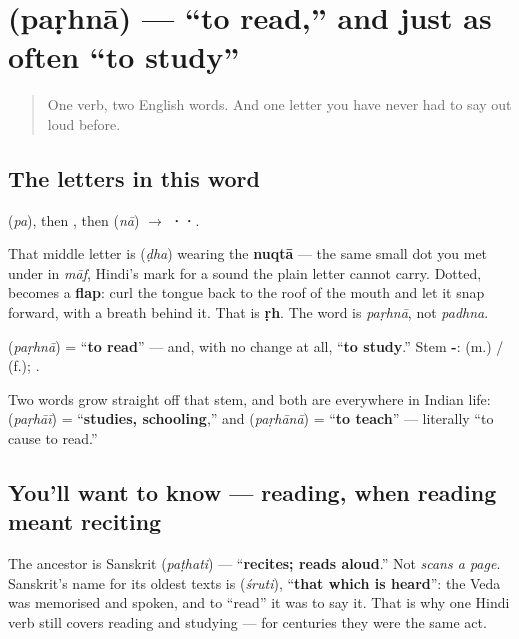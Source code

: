 \section[\texorpdfstring{\hi{पढ़ना} / \hi{पढ़} / \hi{पढ़ता} … (paṛhnā / paṛh …)}{पढ़ना / पढ़ / पढ़ता … (paṛhnā / paṛh …)}]{ (paṛhnā) — \textquotedblleft{}to read,\textquotedblright{} and just as often \textquotedblleft{}to study\textquotedblright{}}

\label{lesson:HI-C34-padhna}



\begin{quote}
One verb, two English words. And one letter you have never had to say out loud before.
\end{quote}

\subsection*{The letters in this word}
\textbf{} (\emph{pa}), then \textbf{}, then \textbf{} (\emph{nā}) $\to$ \textbf{··}.

That middle letter is \textbf{} (\emph{ḍha}) wearing the \textbf{nuqtā} — the same small dot you met under \textbf{} in \emph{māf}, Hindi's mark for a sound the plain letter cannot carry. Dotted, \textbf{} becomes a \textbf{flap}: curl the tongue back to the roof of the mouth and let it snap forward, with a breath behind it. That is \textbf{ṛh}. The word is \emph{paṛhnā}, not \emph{padhna}.

\begin{cousinweb}
\textbf{} (\emph{paṛhnā}) = \textquotedblleft{}\textbf{to read}\textquotedblright{} — and, with no change at all, \textquotedblleft{}\textbf{to study}.\textquotedblright{} Stem \textbf{-}: \textbf{  } (m.) / \textbf{  } (f.); \textbf{  }.

Two words grow straight off that stem, and both are everywhere in Indian life: \textbf{} (\emph{paṛhāī}) = \textquotedblleft{}\textbf{studies, schooling},\textquotedblright{} and \textbf{} (\emph{paṛhānā}) = \textquotedblleft{}\textbf{to teach}\textquotedblright{} — literally \textquotedblleft{}to cause to read.\textquotedblright{}
\end{cousinweb}

\subsection*{You'll want to know — reading, when reading meant reciting}
The ancestor is Sanskrit \textbf{} (\emph{paṭhati}) — \textquotedblleft{}\textbf{recites; reads aloud}.\textquotedblright{} Not \emph{scans a page}. Sanskrit's name for its oldest texts is \textbf{} (\emph{śruti}), \textquotedblleft{}\textbf{that which is heard}\textquotedblright{}: the Veda was memorised and spoken, and to \textquotedblleft{}read\textquotedblright{} it was to say it. That is why one Hindi verb still covers reading and studying — for centuries they were the same act.

